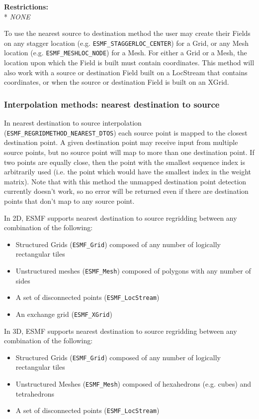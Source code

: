 \smallskip

\textbf{Restrictions:}\\*
\textit{NONE}

\smallskip

 To use the nearest source to destination method the user may create their Fields on any stagger location (e.g. {\tt ESMF\_STAGGERLOC\_CENTER}) for a Grid, or
 any Mesh location (e.g. {\tt ESMF\_MESHLOC\_NODE}) for a Mesh. For either a Grid or a Mesh, the location upon which the Field is built 
 must contain coordinates. This method will also work with a source or destination Field built on a LocStream that contains coordinates, or when the source 
or destination Field is built on an XGrid.


\subsubsection{Interpolation methods: nearest destination to source}\label{sec:interpolation:nearestdtos}
In nearest destination to source interpolation ({\tt ESMF\_REGRIDMETHOD\_NEAREST\_DTOS}) each source point is mapped to the closest destination point. A given destination point may receive input from multiple source points, but no source point will map to more than one destination point. If two points are equally close, then the point with the smallest sequence index is arbitrarily used (i.e. the point which would have the smallest index in the weight matrix). Note that with this method the unmapped destination point detection currently doesn't work, so no error will be returned even if there are destination points that don't map to any source point. 

\smallskip

 In 2D, ESMF supports nearest destination to source regridding between any combination of the following:
 \begin{itemize}
 \item Structured Grids ({\tt ESMF\_Grid}) composed of any number of logically rectangular tiles
 \item Unstructured meshes ({\tt ESMF\_Mesh}) composed of polygons with any number of sides
 \item A set of disconnected points ({\tt ESMF\_LocStream}) 
 \item An exchange grid ({\tt ESMF\_XGrid})
 \end{itemize}

\smallskip

 In 3D, ESMF supports nearest destination to source regridding between any combination of the following:
 \begin{itemize}
 \item Structured Grids ({\tt ESMF\_Grid}) composed of any number of logically rectangular tiles
 \item Unstructured Meshes ({\tt ESMF\_Mesh}) composed of hexahedrons (e.g. cubes) and tetrahedrons
 \item A set of disconnected points ({\tt ESMF\_LocStream}) 
 \end{itemize}

